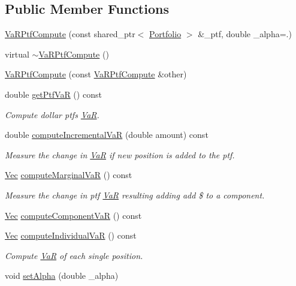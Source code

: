 \subsection*{Public Member Functions}
\begin{DoxyCompactItemize}
\item 
\hyperlink{classVaRPtfCompute_a9e9759706e5c6c69b6d838bb1f01b842}{Va\+R\+Ptf\+Compute} (const shared\+\_\+ptr$<$ \hyperlink{classPortfolio}{Portfolio} $>$ \&\+\_\+ptf, double \+\_\+alpha=.)
\item 
virtual \hyperlink{classVaRPtfCompute_ae148a8c1e965084669cbfec4442b57d5}{$\sim$\+Va\+R\+Ptf\+Compute} ()
\item 
\hyperlink{classVaRPtfCompute_ab2ed8e78a76598f0d3aae10d94e93c1b}{Va\+R\+Ptf\+Compute} (const \hyperlink{classVaRPtfCompute}{Va\+R\+Ptf\+Compute} \&other)
\item 
double \hyperlink{classVaRPtfCompute_a27523a81a27880b98660dbfca1b41873}{get\+Ptf\+VaR} () const
\begin{DoxyCompactList}\small\item\em Compute dollar ptf\textquotesingle{}s \hyperlink{classVaR}{VaR}. \end{DoxyCompactList}\item 
double \hyperlink{classVaRPtfCompute_a21a920a3cd05000dbb4aa504ee0f7bc1}{compute\+Incremental\+VaR} (double amount) const
\begin{DoxyCompactList}\small\item\em Measure the change in \hyperlink{classVaR}{VaR} if new position is added to the ptf. \end{DoxyCompactList}\item 
\hyperlink{compute__returns__eigen_8h_a1eb6a9306ef406d7975f3cbf2e247777}{Vec} \hyperlink{classVaRPtfCompute_ae7a1cb2765156b3c7eff7571b5cb8943}{compute\+Marginal\+VaR} () const
\begin{DoxyCompactList}\small\item\em Measure the change in ptf \hyperlink{classVaR}{VaR} resulting adding add \$ to a component. \end{DoxyCompactList}\item 
\hyperlink{compute__returns__eigen_8h_a1eb6a9306ef406d7975f3cbf2e247777}{Vec} \hyperlink{classVaRPtfCompute_ae25fc1528e8902c7039574b6e6eef1f0}{compute\+Component\+VaR} () const
\item 
\hyperlink{compute__returns__eigen_8h_a1eb6a9306ef406d7975f3cbf2e247777}{Vec} \hyperlink{classVaRPtfCompute_a80964859df50e96558c08445020505cf}{compute\+Individual\+VaR} () const
\begin{DoxyCompactList}\small\item\em Compute \hyperlink{classVaR}{VaR} of each single position. \end{DoxyCompactList}\item 
void \hyperlink{classVaRPtfCompute_ac15972e18d15a25490f9b1ea5a86b021}{set\+Alpha} (double \+\_\+alpha)
\end{DoxyCompactItemize}
